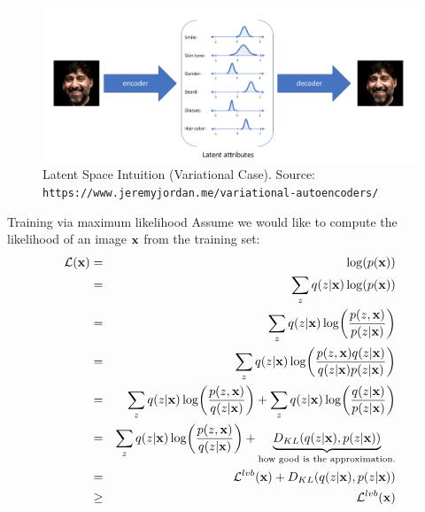 \documentclass[xcolor=pdftex,dvipsnames,table,mathserif]{beamer}
\begin{document}
\begin{frame}
\begin{figure}
\includegraphics[width=.95\columnwidth]{../graphics/LatentSpaceIntuition}
\caption{Latent Space Intuition (\alert{Variational Case}). Source: \texttt{https://www.jeremyjordan.me/variational-autoencoders/}}
\end{figure}
\end{frame}

\begin{frame}{Training via maximum likelihood}
Assume we would like to compute the likelihood of an image $\mathbf{x}$ from the training set:
\begin{eqnarray*}
\mathcal{L}(\mathbf{x}) &=&\log(p(\mathbf{x})) \\
&=& \sum_{z} q(z|\mathbf{x}) \log(p(\mathbf{x})) \\
&=& \sum_{z} q(z|\mathbf{x}) \log(\frac{p(z,\mathbf{x})}{p(z | \mathbf{x})}) \\
&=& \sum_{z} q(z|\mathbf{x}) \log(\frac{p(z,\mathbf{x}) q(z|\mathbf{x})}{q(z|\mathbf{x}) p(z | \mathbf{x})}) \\
&=&  \sum_{z} q(z|\mathbf{x}) \log(\frac{p(z,\mathbf{x}) }{q(z|\mathbf{x})}) + \sum_{z} q(z|\mathbf{x}) \log(\frac{q(z|\mathbf{x}) }{p(z|\mathbf{x})}) \\
&=& \sum_{z} q(z|\mathbf{x}) \log(\frac{p(z,\mathbf{x}) }{q(z|\mathbf{x})})+ \underbrace{D_{KL}(q(z|\mathbf{x}),p(z|\mathbf{x}))}_{\text{how good is the approximation.}}\\
&=& \mathcal{L}^{lvb}(\mathbf{x})+D_{KL}(q(z|\mathbf{x}),p(z|\mathbf{x})) \\
&\geq& \mathcal{L}^{lvb}(\mathbf{x})
\end{eqnarray*}
\end{frame}
\end{document}
